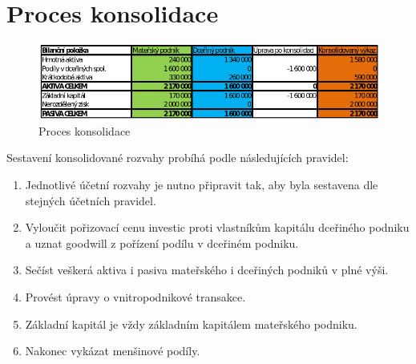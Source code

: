 \documentclass[12pt]{article}
\begin{document}
\section{Proces konsolidace}

\begin{figure}[h]
\begin{center}
	\caption{Proces konsolidace}
		\label{figure:proces-konsolidace}
		\includegraphics[scale=0.6]{pics/4-tabulka.png}
	\end{center}
\end{figure}

Sestavení konsolidované rozvahy probíhá podle následujících pravidel:
\begin{enumerate}
\item Jednotlivé účetní rozvahy je nutno připravit tak, aby byla sestavena dle stejných účetních pravidel.
\item Vyloučit pořizovací cenu investic proti vlastníkům kapitálu dceřiného podniku a uznat goodwill z pořízení podílu v dceřiném podniku.
\item Sečíst veškerá aktiva i pasiva mateřského i dceřiných podniků v plné výši.
\item Provést úpravy o vnitropodnikové transakce.
\item Základní kapitál je vždy základním kapitálem mateřského podniku.
\item Nakonec vykázat menšinové podíly. 
\end{enumerate}
\end{document}
